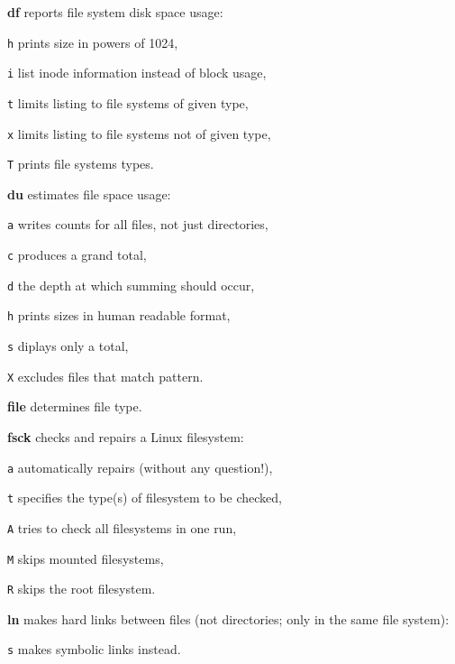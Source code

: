 \begin{enumx}
	\item [\cmdblack] \textbf{df} reports file system disk space usage:
	\item [\texttt{h}] prints size in powers of 1024,
	\item [\texttt{i}] list inode information instead of block usage,
	\item [\texttt{t}] limits listing to file systems of given type,
	\item [\texttt{x}] limits listing to file systems not of given type,
	\item [\texttt{T}] prints file systems types.
	
	\item [\cmdblack] \textbf{du} estimates file space usage:
	\item [\texttt{a}] writes counts for all files, not just directories,
	\item [\texttt{c}] produces a grand total,
	\item [\texttt{d}] the depth at which summing should occur,
	\item [\texttt{h}] prints sizes in human readable format,
	\item [\texttt{s}] diplays only a total,
	\item [\texttt{X}] excludes files that match pattern.
\end{enumx}


\begin{enumx}
	\item [\cmd] \textbf{file} determines file type.
\end{enumx}

\begin{enumx}
	\item [\cmd] \textbf{fsck} checks and repairs a Linux filesystem:
	\item [\texttt{a}] automatically repairs (without any question!),
	\item [\texttt{t}] specifies the type(s) of filesystem to be checked,
	\item [\texttt{A}] tries to check all filesystems in one run,
	\item [\texttt{M}] skips mounted filesystems,
	\item [\texttt{R}] skips the root filesystem.
\end{enumx}

\begin{enumx}
	\item [\cmd] \textbf{ln} makes hard links between files
	(not directories; only in the same file system):
	\item [\texttt{s}]  makes symbolic links instead.
\end{enumx}

